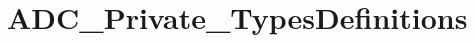 \hypertarget{group___a_d_c___private___types_definitions}{}\section{A\+D\+C\+\_\+\+Private\+\_\+\+Types\+Definitions}
\label{group___a_d_c___private___types_definitions}
